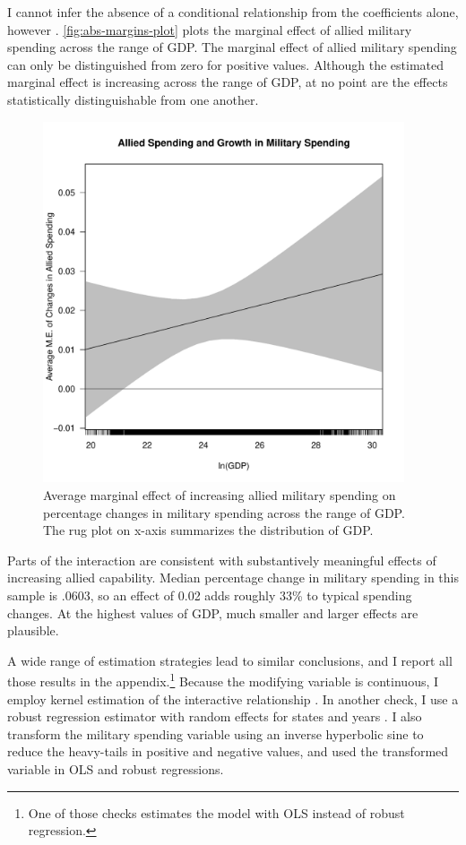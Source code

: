 \documentclass[12pt]{article}
\begin{document}
I cannot infer the absence of a conditional relationship from the coefficients alone, however \citep{BramborClarkGolder2006}. 
\autoref{fig:abs-margins-plot} plots the marginal effect of allied military spending across the range of GDP. 
The marginal effect of allied military spending can only be distinguished from zero for positive values. 
Although the estimated marginal effect is increasing across the range of GDP, at no point are the effects statistically distinguishable from one another. 


\begin{figure}
	\centering
		\includegraphics[width=0.95\textwidth]{abs-margins-plot.pdf}
	\caption{Average marginal effect of increasing allied military spending on percentage changes in military spending across the range of GDP. The rug plot on x-axis summarizes the distribution of GDP.}
		\label{fig:abs-margins-plot}
\end{figure}


Parts of the interaction are consistent with substantively meaningful effects of increasing allied capability. 
Median percentage change in military spending in this sample is .0603, so an effect of 0.02 adds roughly 33\% to typical spending changes. 
At the highest values of GDP, much smaller and larger effects are plausible. 


A wide range of estimation strategies lead to similar conclusions, and I report all those results in the appendix.\footnote{One of those checks estimates the model with OLS instead of robust regression.}
Because the modifying variable is continuous, I employ kernel estimation of the interactive relationship \citep{Hainmuelleretal2019}.
In another check, I use a robust regression estimator with random effects for states and years \citep{Koller2016}. 
I also transform the military spending variable using an inverse hyperbolic sine to reduce the heavy-tails in positive and negative values, and used the transformed variable in OLS and robust regressions. 
\end{document}

